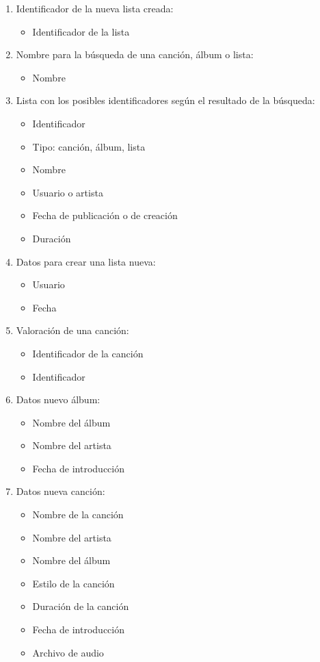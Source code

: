 \documentclass[12pt,a4paper]{article}
\begin{document}
\begin{enumerate}[label=\textnormal{RD\arabic*}]
	\item Identificador de la nueva lista creada: \label{rd5}
		\begin{itemize}
			\item Identificador de la lista
		\end{itemize}
		
	\item Nombre para la búsqueda de una canción, álbum o lista: \label{rd6}
		\begin{itemize}
			\item Nombre
		\end{itemize}
		
	\item Lista con los posibles identificadores según el resultado de la búsqueda: \label{rd7}
		\begin{itemize}
			\item Identificador
			\item Tipo: canción, álbum, lista
			\item Nombre
			\item Usuario o artista
			\item Fecha de publicación o de creación
			\item Duración
		\end{itemize}
		
	\item Datos para crear una lista nueva: \label{rd8}
		\begin{itemize}
			\item Usuario
			\item Fecha 
		\end{itemize}
		
	\item Valoración de una canción: \label{rd9}
		\begin{itemize}
			\item Identificador de la canción
			\item Identificador
		\end{itemize}
		
	\item Datos nuevo álbum: \label{rd10}
		\begin{itemize}
		    \item Nombre del álbum
		    \item Nombre del artista
		    \item Fecha de introducción
		\end{itemize}
		
	\item Datos nueva canción: \label{rd11}
		\begin{itemize}
		    \item Nombre de la canción
		    \item Nombre del artista
		    \item Nombre del álbum
		    \item Estilo de la canción
		    \item Duración de la canción
		    \item Fecha de introducción
		    \item Archivo de audio
		\end{itemize}
		

\end{enumerate}
\end{document}
